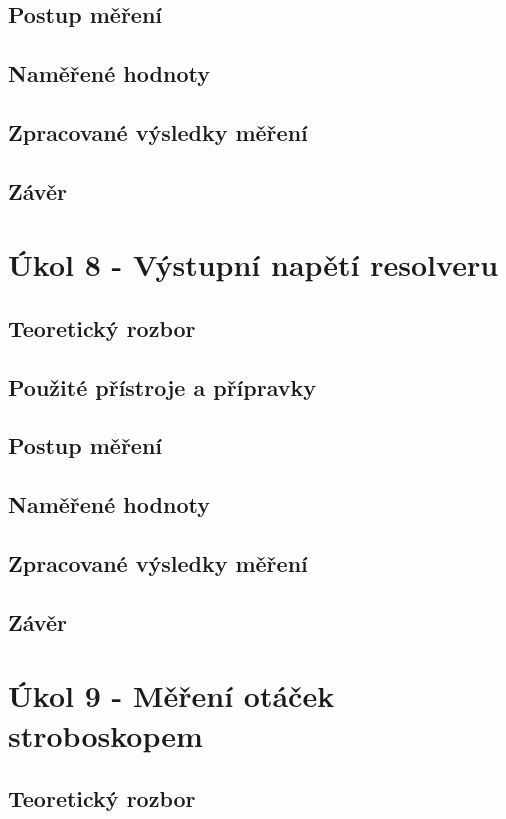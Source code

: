 \documentclass{protokol}
\begin{document}
    \subsection{Postup měření}
    \subsection{Naměřené hodnoty}
    \subsection{Zpracované výsledky měření}
    \subsection{Závěr}

\pagebreak
\section{Úkol 8 - Výstupní napětí resolveru}
    \subsection{Teoretický rozbor}
    \subsection{Použité přístroje a přípravky}
    \subsection{Postup měření}
    \subsection{Naměřené hodnoty}
    \subsection{Zpracované výsledky měření}
    \subsection{Závěr}

\pagebreak


\section{Úkol 9 - Měření otáček stroboskopem}
    \subsection{Teoretický rozbor}
\end{document}

